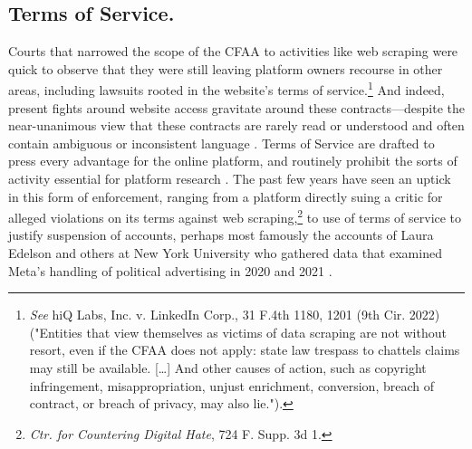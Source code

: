 \subsection{Terms of Service.} 
\label{sec:tos}
Courts that narrowed the scope of the CFAA to activities like web scraping were quick to observe that they were still leaving platform owners recourse in other areas, including lawsuits rooted in the website's terms of service.\footnote{\textit{See} hiQ Labs, Inc. v. LinkedIn Corp., 31 F.4th 1180, 1201 (9th Cir. 2022) ("Entities that view themselves as victims of data scraping are not without resort, even if the CFAA does not apply: state law trespass to chattels claims may still be available. […] And other causes of action, such as copyright infringement, misappropriation, unjust enrichment, conversion, breach of contract, or breach of privacy, may also lie.").} And indeed, present fights around website access gravitate around these contracts---despite the near-unanimous view that these contracts are rarely read or understood and often contain ambiguous or inconsistent language \cite{fiesler_no_2020}. Terms of Service are drafted to press every advantage for the online platform, and routinely prohibit the sorts of activity essential for platform research \cite{bhandari2024}. The past few years have seen an uptick in this form of enforcement, ranging from a platform directly suing a critic for alleged violations on its terms against web scraping,\footnote{\textit{Ctr. for Countering Digital Hate}, 724 F. Supp. 3d 1.} to use of terms of service to justify suspension of accounts, perhaps most famously the accounts of Laura Edelson and others at New York University who gathered data that examined Meta's handling of political advertising in 2020 and 2021 \cite{longpre_safe_2024, gilbert2024risks}. 

